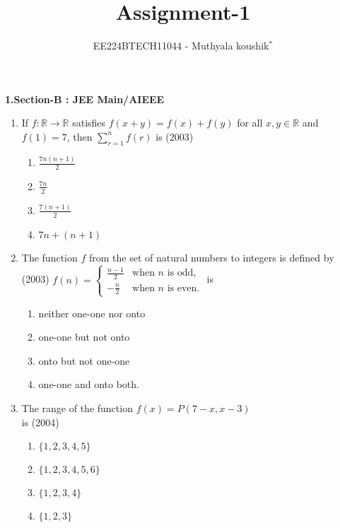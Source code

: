 \documentclass[journal,12pt,twocolumn]{IEEEtran}
\theoremstyle{remark}
\begin{document}

\vspace{3cm}

\title{Assignment-1}
\author{EE224BTECH11044 - Muthyala koushik$^{*}$%
}
\maketitle
\newpage
\bigskip

\renewcommand{\thefigure}{\theenumi}
\renewcommand{\thetable}{\theenumi}

\textbf{1.Section-B : JEE Main/AIEEE}
\begin{enumerate}[start=4]
     \item If $f: \mathbb{R} \to \mathbb{R}$ satisfies $f(x+y) = f(x) + f(y)$ for all $x, y \in \mathbb{R}$ and $f(1) = 7$, then $\sum_{r=1}^n f(r)$ is \hfill(2003)
		
    \begin{enumerate}
        \item $\frac{7n(n+1)}{2}$\\
        \item $\frac{7n}{2}$\\
        \item $\frac{7(n+1)}{2}$\\
        \item $7n + (n+1)$
    \end{enumerate}

    \item The function $f$ from the set of natural numbers to integers is defined by \hfill(2003)
               $f(n) = \begin{cases} \frac{n-1}{2} & \text{when } n \text{ is odd}, \\-\frac{n}{2} & \text{when } n \text{ is even}.\end{cases}$ is

	\begin{enumerate}
		\item neither one-one nor onto
		\item one-one but not onto
		\item onto but not one-one
		\item one-one and onto both.
	\end{enumerate} 

     \item The range of the function $f(x)=P(7-x,x-3)$ \\ is \hfill(2004)
	\begin{enumerate}
		\item $\{1,2,3,4,5\}$
		\item $\{1,2,3,4,5,6\}$
		\item $\{1,2,3,4\}$
		\item $\{1,2,3\}$
	\end{enumerate}


\end{enumerate}
\end{document}
